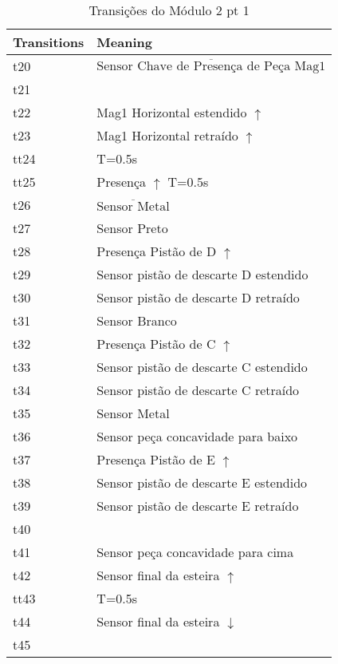 \begin{table}[htbp]
\caption{Transições do Módulo 2 pt 1}
\centering
\begin{tabular}{ll}
Transitions & Meaning\\
\hline
t20 & \(\overline{\mbox{Sensor Chave de Presença de Peça Mag1}}\)\\
t21 & \\
t22 & Mag1 Horizontal estendido \(\uparrow\)\\
t23 & Mag1 Horizontal retraído \(\uparrow\)\\
tt24 & T=0.5s\\
tt25 & Presença \(\uparrow\) T=0.5s\\
t26 & \(\overline{\mbox{Sensor Metal}}\)\\
t27 & Sensor Preto\\
t28 & Presença Pistão de D \(\uparrow\)\\
t29 & Sensor pistão de descarte D estendido\\
t30 & Sensor pistão de descarte D retraído\\
t31 & Sensor Branco\\
t32 & Presença Pistão de C \(\uparrow\)\\
t33 & Sensor pistão de descarte C estendido\\
t34 & Sensor pistão de descarte C retraído\\
t35 & Sensor Metal\\
t36 & Sensor peça concavidade para baixo\\
t37 & Presença Pistão de E \(\uparrow\)\\
t38 & Sensor pistão de descarte E estendido\\
t39 & Sensor pistão de descarte E retraído\\
t40 & \\
t41 & Sensor peça concavidade para cima\\
t42 & Sensor final da esteira \(\uparrow\)\\
tt43 & T=0.5s\\
t44 & Sensor final da esteira \(\downarrow\)\\
t45 & \\
\end{tabular}
\end{table}
